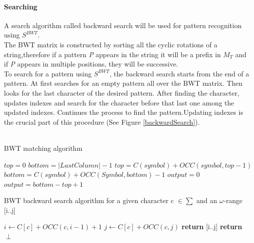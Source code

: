\documentclass[11pt,a4paper]{report}
\begin{document}
\paragraph{Searching}
A search algorithm called backward search will be used 
for pattern recognition using $S^{BWT}$.\\

The BWT matrix is constructed by sorting all the cyclic
rotations of a string,therefore if a pattern \emph{P} 
appears in the string it will be a prefix in $M_{T}$ 
and if \emph {P} appears in multiple positions, they 
will be successive.\\ 
To search for a pattern using $S^{BWT}$, the backward 
search starts from the end of a pattern.
At first searches for an empty  pattern all over the 
BWT matrix. Then looks for the last character of the 
desired pattern. After finding the character, updates 
indexes and search for the character before that last 
one among the updated indexes. Continues the process 
to find the pattern.Updating indexes is the crucial 
part of this procedure (See Figure \ref{backwardSearch}).\\\\


\begin{algorithm}[H]
   \caption{BWT matching algorithm}
    \begin{algorithmic}[1]
       	\State ${top} = 0$
        \State ${bottom} = \lvert LastColumn \rvert -1$
        				\State $top = C(symbol)+ OCC(symbol,top-1)$
        				\State $bottom = C(symbol)+ OCC(Symbol,bottom)-1$
        			\Else
        				\State $output = 0 $
        			\EndIf
       		\Else 
       			\State $output = bottom-top+1 $ 
       \EndIf
     
     \EndWhile 
    \EndFunction

	\end{algorithmic}
  \label{BWT matching alg}	
\end{algorithm}





\begin{algorithm}[H]
   \caption{BWT backward search algorithm for a given character 
   c $\in \sum $ and an $\omega$-range [i..j]}
   
    \begin{algorithmic}[1]
       	\State ${i \leftarrow C[c] + OCC(c, i-1)+1}$
        \State ${j \leftarrow C[c] + OCC(c,j)}$
        		\State \textbf{return} [i..j]
        	\Else
        		\State \textbf{return} $\perp$
        	\EndIf 
    \EndFunction

	\end{algorithmic}
  \label{backward search alg}	
\end{algorithm}
\end{document}
